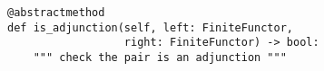 \begin{verbatim}
@abstractmethod
def is_adjunction(self, left: FiniteFunctor,
                  right: FiniteFunctor) -> bool:
    """ check the pair is an adjunction """
\end{verbatim}